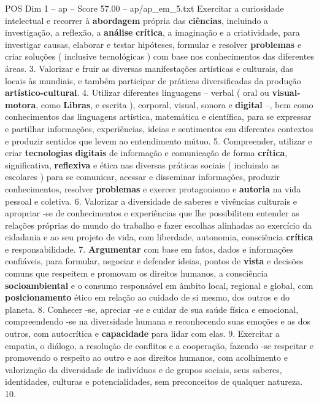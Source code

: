 \begin{textsample}{POS Dim 1 – ap – Score 57.00 – ap/ap\_em\_5.txt}
Exercitar a curiosidade intelectual e recorrer à \textbf{abordagem} própria das \textbf{ciências}, incluindo a investigação, a reflexão, a \textbf{análise} \textbf{crítica}, a imaginação e a criatividade, para investigar causas, elaborar e testar hipóteses, formular e resolver \textbf{problemas} e criar soluções ( inclusive tecnológicas ) com base nos conhecimentos das diferentes áreas. 3.
Valorizar e fruir as diversas manifestações artísticas e culturais, das locais às mundiais, e também participar de práticas diversificadas da produção \textbf{artístico-cultural}. 4.
Utilizar diferentes linguagens – verbal ( oral ou \textbf{visual-motora}, como \textbf{Libras}, e escrita ), corporal, visual, sonora e \textbf{digital} –, bem como conhecimentos das linguagens artística, matemática e científica, para se expressar e partilhar informações, experiências, ideias e sentimentos em diferentes contextos e produzir sentidos que levem ao entendimento mútuo. 5.
Compreender, utilizar e criar \textbf{tecnologias} \textbf{digitais} de informação e comunicação de forma \textbf{crítica}, significativa, \textbf{reflexiva} e ética nas diversas práticas sociais ( incluindo as escolares ) para se comunicar, acessar e disseminar informações, produzir conhecimentos, resolver \textbf{problemas} e exercer protagonismo e \textbf{autoria} na vida pessoal e coletiva. 6.
Valorizar a diversidade de saberes e vivências culturais e apropriar -se de conhecimentos e experiências que lhe possibilitem entender as relações próprias do mundo do trabalho e fazer escolhas alinhadas ao exercício da cidadania e ao seu projeto de vida, com liberdade, autonomia, consciência \textbf{crítica} e responsabilidade. 7. \textbf{Argumentar} com base em fatos, dados e informações confiáveis, para formular, negociar e defender ideias, pontos de \textbf{vista} e decisões comuns que respeitem e promovam os direitos humanos, a consciência \textbf{socioambiental} e o consumo responsável em âmbito local, regional e global, com \textbf{posicionamento} ético em relação ao cuidado de si mesmo, dos outros e do planeta. 8.
Conhecer -se, apreciar -se e cuidar de sua saúde física e emocional, compreendendo -se na diversidade humana e reconhecendo suas emoções e as dos outros, com autocrítica e \textbf{capacidade} para lidar com elas. 9.
Exercitar a empatia, o diálogo, a resolução de conflitos e a cooperação, fazendo -se respeitar e promovendo o respeito ao outro e aos direitos humanos, com acolhimento e valorização da diversidade de indivíduos e de grupos sociais, seus saberes, identidades, culturas e potencialidades, sem preconceitos de qualquer natureza. 10.

\end{textsample}
